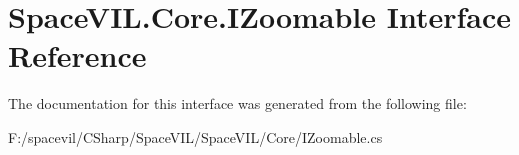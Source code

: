 \hypertarget{interface_space_v_i_l_1_1_core_1_1_i_zoomable}{}\section{Space\+V\+I\+L.\+Core.\+I\+Zoomable Interface Reference}
\label{interface_space_v_i_l_1_1_core_1_1_i_zoomable}


The documentation for this interface was generated from the following file\+:\begin{DoxyCompactItemize}
\item 
F\+:/spacevil/\+C\+Sharp/\+Space\+V\+I\+L/\+Space\+V\+I\+L/\+Core/I\+Zoomable.\+cs\end{DoxyCompactItemize}
